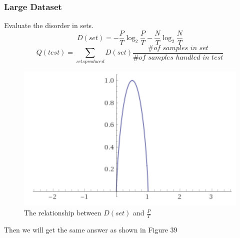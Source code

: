 \documentclass[12pt]{book}
\begin{document}
\subsubsection{Large Dataset}
Evaluate the disorder in sets.
$$D(set) = -\frac{P}{T}\log_2\frac{P}{T}-\frac{N}{T}\log_2\frac{N}{T}$$
$$Q(test) = \sum_{sets produced}D(set)\frac{\# of \,\, samples \,\, in \,\, set}{\# of \,\, samples \,\, handled \,\, in \,\, test}$$
\begin{figure}[ht]
	\centering
	\includegraphics[scale=0.7]{Figure/Figure11_4.png}
	\caption{The relationship between $D(set)$ and $\frac{P}{T}$}
\end{figure}\newline
\indent Then we will get the same answer as shown in Figure 39
\end{document}

